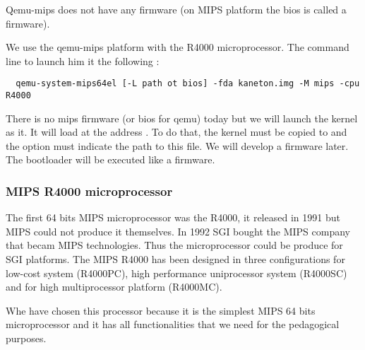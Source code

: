 Qemu-mips does not have any firmware (on MIPS platform the bios is called a firmware).

We use the qemu-mips platform with the R4000 microprocessor. The command line to launch him it the following :

\begin{verbatim}
  qemu-system-mips64el [-L path ot bios] -fda kaneton.img -M mips -cpu R4000
\end{verbatim}

There is no mips firmware (or bios for qemu) today but we will launch the kernel as it. It will load at the address . To do that, the kernel must be copied to  and the  option must indicate the path to this file. We will develop a firmware later.
The bootloader will be executed like a firmware.

\subsubsection{MIPS R4000 microprocessor}

The first 64 bits MIPS microprocessor was the R4000, it released in 1991 but MIPS could not produce it themselves.
In 1992 SGI bought the MIPS company that becam MIPS technologies. Thus the microprocessor could be produce for SGI platforms. The MIPS R4000 has been designed in three configurations for low-cost system (R4000PC), high performance uniprocessor system (R4000SC) and for high multiprocessor platform (R4000MC).

Whe have chosen this processor because it is the simplest MIPS 64 bits microprocessor and it has all functionalities that we need for the pedagogical purposes.
